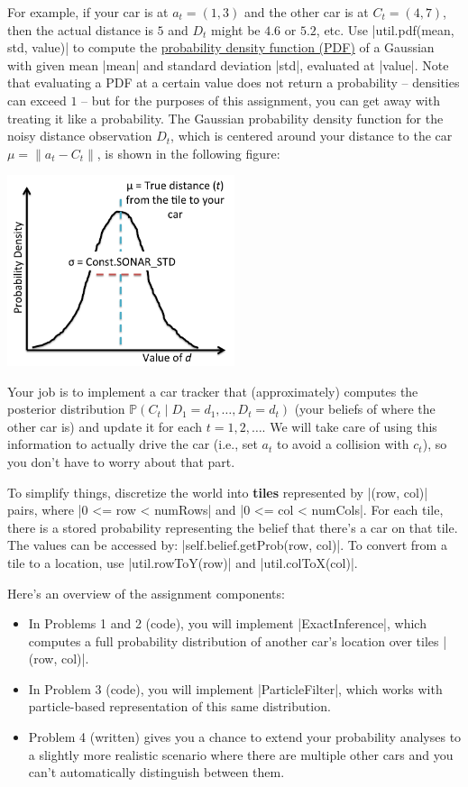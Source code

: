 For example, if your car is at $a_t = (1,3)$ and the other car is at $C_t =
(4,7)$, then the actual distance is $5$ and $D_t$ might be $4.6$ or $5.2$, etc.
Use |util.pdf(mean, std, value)| to compute the \href{http://en.wikipedia.org/wiki/Probability_density_function}{probability density function (PDF)} of a Gaussian
with given mean |mean| and standard deviation |std|, evaluated at |value|. Note
that evaluating a PDF at a certain value does not return a probability --
densities can exceed $1$ -- but for the purposes of this assignment, you can get
away with treating it like a probability. The Gaussian probability density
function for the noisy distance observation $D_t$, which is centered around your
distance to the car $\mu = \|a_t - C_t\|$, is shown in the following figure:
\begin{center}
\includegraphics[width=0.5\textwidth]{media/pdf.png}
\end{center}

Your job is to implement a car tracker that (approximately) computes the
posterior distribution $\mathbb P(C_t \mid D_1 = d_1, \dots, D_t = d_t)$ (your
beliefs of where the other car is) and update it for each $t = 1, 2, \dots$.  We
will take care of using this information to actually drive the car (i.e., set
$a_t$ to avoid a collision with $c_t$), so you don't have to worry about that
part.

To simplify things, discretize the world into {\bf tiles} represented by
|(row, col)| pairs, where |0 <= row < numRows| and |0 <= col < numCols|. For
each tile, there is a stored probability representing the belief that there's a car on
that tile. The values can be accessed by: |self.belief.getProb(row, col)|. To
convert from a tile to a location, use |util.rowToY(row)| and
|util.colToX(col)|.

Here's an overview of the assignment components:
  
\begin{itemize}
  \item In Problems 1 and 2 (code), you will implement |ExactInference|, which
  computes a full probability distribution of another car's location over tiles
  |(row, col)|.
  \item In Problem 3 (code), you will implement |ParticleFilter|, which works
  with particle-based representation of this same distribution.
  \item Problem 4 (written) gives you a chance to extend your probability analyses
  to a slightly more realistic scenario where there are multiple other cars and
  you can't automatically distinguish between them.
\end{itemize}
\clearpage


